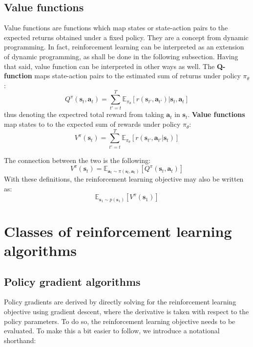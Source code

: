 \subsection{Value functions}
Value functions are functions which map states or state-action pairs
to the expected returns obtained under a fixed policy.
They are a concept from dynamic programming. In fact,
reinforcement learning can be interpreted as an extension of dynamic programming,
as shall be done in the following subsection.
Having that said, value function can be interpreted in other ways as well.
The \textbf{Q-function} maps state-action pairs to the estimated sum of returns
under policy $ \pi_{ \theta } $:
\begin{equation}
		\label{eq:q-function}
		Q^\pi (\bm{s}_t, \bm{a}_t) = \sum_{t'=t}^{T} \mathbb{E}_{\pi_\theta}
		\left[ r(\bm{s}_{t'}, \bm{a}_{t'} )| \bm{s}_t, \bm{a}_t \right] 
\end{equation}
thus denoting the expectred total reward from taking $\bm{a}_t$ in $\bm{s}_t$.
\textbf{Value functions} map states to to the expected sum of rewards
under policy $ \pi_{ \theta } $:
\begin{equation}
		\label{eq:value-function}
		V^\pi (\bm{s}_t) = \sum_{t'=t}^{T} \mathbb{E}_{\pi_\theta}
		\left[ r(\bm{s}_{t'}, \bm{a}_{t'} | \bm{s}_t) \right] 
\end{equation}

The connection between the two is the following:
\begin{equation}
		V^\pi (\bm{s}_t) = \mathbb{E}_{\bm{a}_t \sim \pi(\bm{s}_t, \bm{a}_t)}
		\left[ Q^\pi(\bm{s}_t, \bm{a}_t) \right] 
\end{equation}
With these definitions, the reinforcement learning objective may also be written as:
\begin{equation}
		\mathbb{E}_{\bm{s}_1 \sim p(\bm{s}_1)}
		\left[ V^\pi (\bm{s}_1) \right] 
\end{equation}


\section{Classes of reinforcement learning algorithms}
\label{sec-rl-alg-classes}
\subsection{Policy gradient algorithms}
\label{sub-policy-gradient}
Policy gradients are derived by directly solving for
the reinforcement learning objective using gradient descent,
where the derivative is taken with respect to the policy parameters.
To do so, the reinforcement learning objective needs to be evaluated.
To make this a bit easier to follow, we introduce a notational shorthand:

